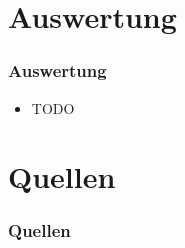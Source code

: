 \documentclass[xcolor=dvipsnames]{beamer}
\begin{document}

\section{Auswertung}
\begin{frame}
    \frametitle{Auswertung}
    \begin{itemize}
      \item TODO
    \end{itemize}
\end{frame}


\section{Quellen}
\begin{frame}[allowframebreaks]
  \frametitle{Quellen}

  \nocite{UmrechnungGoldmark}
  \nocite{buernheim1997bahnen}
  \nocite{hoeltge1992hessen}
  \nocite{BybaneBergen}
  \nocite{BergenCurrentStatus}
  \nocite{midttrafik}
  \nocite{UmrechnungKronen}
  \nocite{osm}
  \nocite{ba3reform}
  \nocite{ReformEroeffnung}
  \nocite{hallodubai}
  \nocite{gulfnews2009costs}

  \begin{scriptsize}
    
  \end{scriptsize}
\end{frame}

\end{document}
